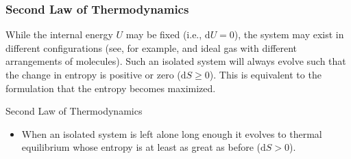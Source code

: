 \documentclass[letterpaper,10pt,english]{sphinxmanual}
\begin{document}
\subsubsection{Second Law of Thermodynamics}
\label{\detokenize{notebooks/L1/2_Thermodynamics_Statistics:Second-Law-of-Thermodynamics}}
\sphinxAtStartPar
While the internal energy \(U\) may be fixed (i.e., \(\mathrm{d}U=0\)), the system may exist in different configurations (see, for example, and ideal gas with different arrangements of molecules). Such an isolated system will always evolve such that the change in entropy is positive or zero (\(\mathrm{d}S\ge 0\)). This is equivalent to the formulation that the entropy becomes maximized.



\sphinxAtStartPar
{} Second Law of Thermodynamics
\begin{itemize}
\item {} 
\sphinxAtStartPar
When an isolated system is left alone long enough it evolves to thermal equilibrium whose entropy is at least as great as before (\(\mathrm{d}S \gt 0\)).

\end{itemize}
\end{document}
